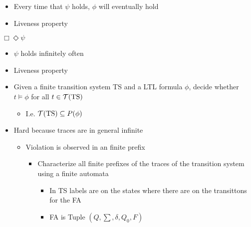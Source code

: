 \begin{itemize}
\begin{itemize}
\begin{itemize}
\begin{itemize}
                                \begin{itemize}
                                    \item Every time that $\psi$ holds, $\phi$ will eventually hold
                                    \item Liveness property
                                \end{itemize}
                             $\Box \Diamond \psi$
                                \begin{itemize}
                                    \item $\psi$ holds infinitely often
                                    \item Liveness property
                                \end{itemize}
                        \end{itemize}
                \end{itemize}
                \begin{itemize}
                    \item Given a finite transition system TS and a LTL formula $\phi$, decide whether $t \models \phi$ for all $t \in \mathcal{T}(\text{TS})$
                        \begin{itemize}
                            \item I.e. $\mathcal{T}(\text{TS}) \subseteq P(\phi)$
                        \end{itemize}
                    \item Hard because traces are in general infinite
                        \begin{itemize}
                            \item Violation is observed in an finite prefix
                                \begin{itemize}
                                    \item Characterize all finite prefixes of the traces of the transition system using a finite automata
                                        \begin{itemize}
                                            \item In TS labels are on the states where there are on the transittons for the FA
                                            \item FA is Tuple $(Q, \sum, \delta, Q_0, F)$

\end{itemize}
\end{itemize}
\end{itemize}
\end{itemize}
\end{itemize}
\end{itemize}
